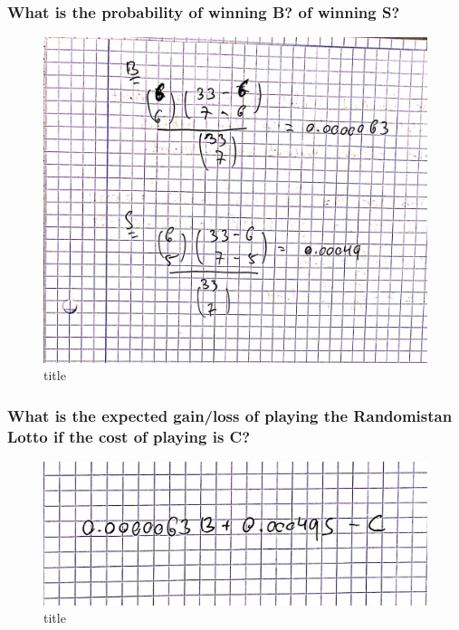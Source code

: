 \documentclass[11pt]{article}
\makeatletter
\def\maxwidth{\ifdim\Gin@nat@width>\linewidth\linewidth
    \else\Gin@nat@width\fi}
\let\Oldincludegraphics\includegraphics
\renewcommand{\includegraphics}[1]{\Oldincludegraphics[width=.8\maxwidth]{#1}}
\makeatother
\begin{document}
    \hypertarget{what-is-the-probability-of-winning-b-of-winning-s}{%
\subsubsection{What is the probability of winning B? of winning
S?}\label{what-is-the-probability-of-winning-b-of-winning-s}}

    \begin{figure}
\centering
\includegraphics{3-1.JPG}
\caption{title}
\end{figure}

    \hypertarget{what-is-the-expected-gainloss-of-playing-the-randomistan-lotto-if-the-cost-of-playing-is-c}{%
\subsubsection{What is the expected gain/loss of playing the Randomistan
Lotto if the cost of playing is
C?}\label{what-is-the-expected-gainloss-of-playing-the-randomistan-lotto-if-the-cost-of-playing-is-c}}

    \begin{figure}
\centering
\includegraphics{3-2.JPG}
\caption{title}
\end{figure}
\end{document}
